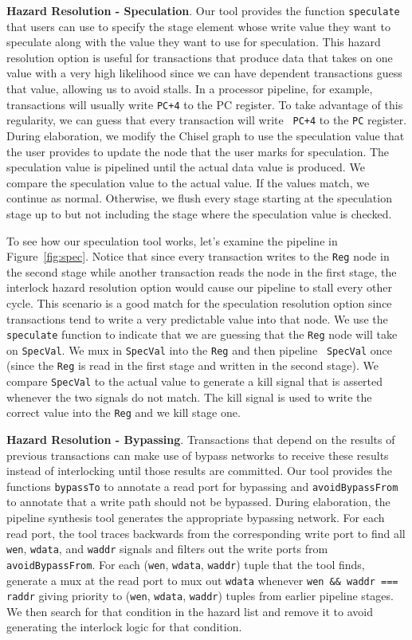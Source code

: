 {\bf Hazard Resolution - Speculation}. Our tool provides the function
{\tt speculate} that users can use to specify the stage element whose
write value they want 
to speculate along with the value they want to use for
speculation. This hazard resolution option is useful for transactions
that produce data that takes on one value with a very high likelihood
since we can have dependent transactions guess that value, allowing us
to avoid stalls. In a processor pipeline, for example, transactions
will usually write {\tt PC+4} to the PC register. To take advantage of
this regularity, we can guess that every transaction will write {\tt
  PC+4} to the {\tt PC} register. During elaboration, we modify the
Chisel graph to use the speculation value that the user provides to
update the node that the user marks for speculation. The speculation
value is pipelined until the actual data value is produced. We compare
the speculation value to the actual value. If the values match, we
continue as normal. Otherwise, we flush every stage starting at the
speculation stage up to but not including the stage where the
speculation value is checked.

To see how our speculation tool works, let's examine the pipeline in
Figure~\ref{fig:spec}. Notice that since every
transaction writes to the {\tt Reg} node in the second stage while
another transaction reads the node in the first stage, the interlock
hazard resolution option would cause our pipeline to stall every other
cycle. This scenario is a good match for the speculation resolution
option since transactions tend to write a very predictable value into
that node. We use the {\tt speculate} function to indicate that we
are guessing that the {\tt Reg} node will take on {\tt SpecVal}. We
mux in {\tt SpecVal} into the {\tt Reg} and then pipeline {\tt
  SpecVal} once (since the {\tt Reg} is read in the first stage and
written in the second stage). We compare {\tt SpecVal} to the actual
value to generate a kill signal that is asserted whenever the two
signals do not match. The kill signal is used to write the correct
value into the {\tt Reg} and we kill stage one.

{\bf Hazard Resolution - Bypassing}. Transactions that depend on the
results of previous transactions can make use of bypass networks to
receive these results instead of interlocking until those results are
committed. Our tool provides the functions {\tt bypassTo} to annotate
a read port for bypassing and {\tt avoidBypassFrom} to annotate that a
write path should not be bypassed. During elaboration, the pipeline
synthesis tool generates the appropriate bypassing network. For each
read port, the tool traces backwards from the corresponding write port
to find all {\tt wen}, {\tt wdata}, and {\tt waddr} signals and filters
out the write ports from {\tt avoidBypassFrom}. For each ({\tt wen},
{\tt wdata}, {\tt waddr}) tuple that the tool finds, generate a mux
at the read port to mux out {\tt wdata} whenever {\tt wen \&\& waddr
  === raddr} giving priority to ({\tt wen}, {\tt wdata}, {\tt waddr})
tuples from earlier pipeline stages. We then search for that condition
in the hazard list and remove it to avoid generating the interlock
logic for that condition. 

